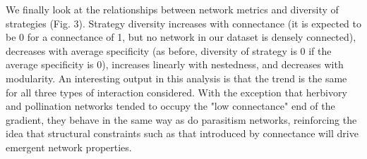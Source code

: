 We finally look at the relationships between network metrics and diversity
of strategies (Fig. 3). Strategy diversity increases with connectance (it
is expected to be 0 for a connectance of 1, but no network in our dataset is
densely connected), decreases with average specificity (as before, diversity
of strategy is 0 if the average specificity is 0), increases linearly with
nestedness, and decreases with modularity. An interesting output in this
analysis is that the trend is the same for all three types of interaction
considered. With the exception that herbivory and pollination networks tended
to occupy the "low connectance" end of the gradient, they behave in the same
way as do parasitism networks, reinforcing the idea that structural constraints
such as that introduced by connectance will drive emergent network properties.
